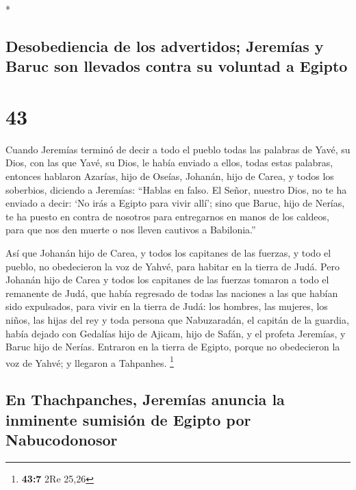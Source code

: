 \begin{paracol}{2}
\begin{otherlanguage}{english}
\end{otherlanguage}

\switchcolumn[0]*

\hypertarget{desobediencia-de-los-advertidos-jeremuxedas-y-baruc-son-llevados-contra-su-voluntad-a-egipto}{%
\subsection{Desobediencia de los advertidos; Jeremías y Baruc son
llevados contra su voluntad a
Egipto}\label{desobediencia-de-los-advertidos-jeremuxedas-y-baruc-son-llevados-contra-su-voluntad-a-egipto}}

\hypertarget{section-84}{%
\section{43}\label{section-84}}

 Cuando Jeremías terminó de decir a todo el pueblo todas
las palabras de Yavé, su Dios, con las que Yavé, su Dios, le había
enviado a ellos, todas estas palabras,  entonces hablaron
Azarías, hijo de Oseías, Johanán, hijo de Carea, y todos los soberbios,
diciendo a Jeremías: ``Hablas en falso. El Señor, nuestro Dios, no te ha
enviado a decir: `No irás a Egipto para vivir allí';  sino
que Baruc, hijo de Nerías, te ha puesto en contra de nosotros para
entregarnos en manos de los caldeos, para que nos den muerte o nos
lleven cautivos a Babilonia.''

 Así que Johanán hijo de Carea, y todos los capitanes de
las fuerzas, y todo el pueblo, no obedecieron la voz de Yahvé, para
habitar en la tierra de Judá.  Pero Johanán hijo de Carea
y todos los capitanes de las fuerzas tomaron a todo el remanente de
Judá, que había regresado de todas las naciones a las que habían sido
expulsados, para vivir en la tierra de Judá:  los hombres,
las mujeres, los niños, las hijas del rey y toda persona que
Nabuzaradán, el capitán de la guardia, había dejado con Gedalías hijo de
Ajicam, hijo de Safán, y el profeta Jeremías, y Baruc hijo de Nerías.
 Entraron en la tierra de Egipto, porque no obedecieron la
voz de Yahvé; y llegaron a Tahpanhes. \footnote{\textbf{43:7} 2Re 25,26}

\hypertarget{en-thachpanches-jeremuxedas-anuncia-la-inminente-sumisiuxf3n-de-egipto-por-nabucodonosor}{%
\subsection{En Thachpanches, Jeremías anuncia la inminente sumisión de
Egipto por
Nabucodonosor}\label{en-thachpanches-jeremuxedas-anuncia-la-inminente-sumisiuxf3n-de-egipto-por-nabucodonosor}}


\end{paracol}

